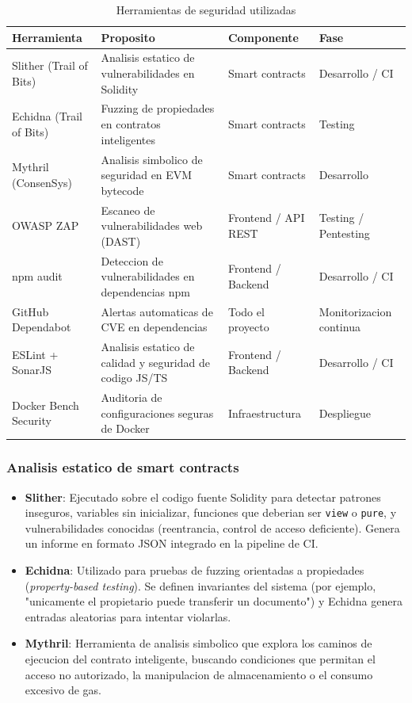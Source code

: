 \documentclass[11pt, a4paper]{article}
\begin{document}
\begin{table}[H]
\centering
\renewcommand{\arraystretch}{1.4}
\small
\begin{tabular}{|l|p{3.5cm}|p{3.5cm}|l|}
\hline
\textbf{Herramienta} & \textbf{Proposito} & \textbf{Componente} & \textbf{Fase} \\
\hline
Slither (Trail of Bits) & Analisis estatico de vulnerabilidades en Solidity & Smart contracts & Desarrollo / CI \\
\hline
Echidna (Trail of Bits) & Fuzzing de propiedades en contratos inteligentes & Smart contracts & Testing \\
\hline
Mythril (ConsenSys) & Analisis simbolico de seguridad en EVM bytecode & Smart contracts & Desarrollo \\
\hline
OWASP ZAP & Escaneo de vulnerabilidades web (DAST) & Frontend / API REST & Testing / Pentesting \\
\hline
npm audit & Deteccion de vulnerabilidades en dependencias npm & Frontend / Backend & Desarrollo / CI \\
\hline
GitHub Dependabot & Alertas automaticas de CVE en dependencias & Todo el proyecto & Monitorizacion continua \\
\hline
ESLint + SonarJS & Analisis estatico de calidad y seguridad de codigo JS/TS & Frontend / Backend & Desarrollo / CI \\
\hline
Docker Bench Security & Auditoria de configuraciones seguras de Docker & Infraestructura & Despliegue \\
\hline
\end{tabular}
\caption{Herramientas de seguridad utilizadas}
\label{tab:herramientas}
\end{table}

\subsubsection{Analisis estatico de smart contracts}

\begin{itemize}
    \item \textbf{Slither}: Ejecutado sobre el codigo fuente Solidity para detectar patrones inseguros, variables sin inicializar, funciones que deberian ser \texttt{view} o \texttt{pure}, y vulnerabilidades conocidas (reentrancia, control de acceso deficiente). Genera un informe en formato JSON integrado en la pipeline de CI.
    \item \textbf{Echidna}: Utilizado para pruebas de fuzzing orientadas a propiedades (\textit{property-based testing}). Se definen invariantes del sistema (por ejemplo, "unicamente el propietario puede transferir un documento") y Echidna genera entradas aleatorias para intentar violarlas.
    \item \textbf{Mythril}: Herramienta de analisis simbolico que explora los caminos de ejecucion del contrato inteligente, buscando condiciones que permitan el acceso no autorizado, la manipulacion de almacenamiento o el consumo excesivo de gas.
\end{itemize}
\end{document}
